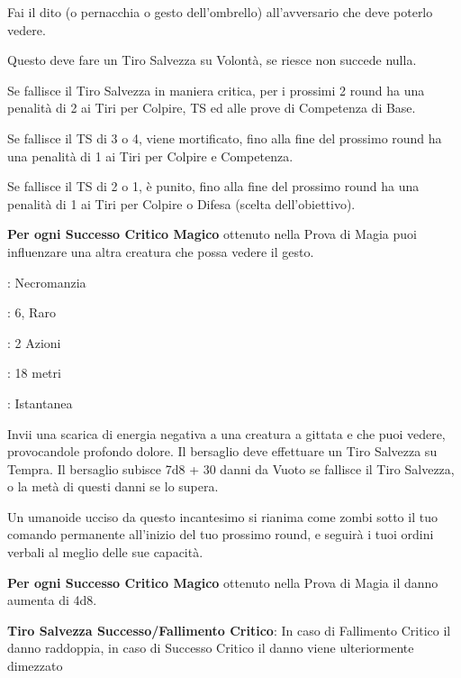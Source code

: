 \begin{multicols}{2}
Fai il dito (o pernacchia o gesto dell'ombrello) all'avversario che deve poterlo vedere.

Questo deve fare un Tiro Salvezza su Volontà, se riesce non succede nulla.

Se fallisce il Tiro Salvezza in maniera critica, per i prossimi 2 round ha una penalità di 2 ai Tiri per Colpire, TS ed alle prove di Competenza di Base.

Se fallisce il TS di 3 o 4, viene mortificato, fino alla fine del prossimo round ha una penalità di 1 ai Tiri per Colpire e Competenza.

Se fallisce il TS di 2 o 1, è punito, fino alla fine del prossimo round ha una penalità di 1 ai Tiri per Colpire o Difesa (scelta dell'obiettivo).

\textbf{Per ogni Successo Critico Magico} ottenuto nella Prova di Magia puoi influenzare una altra creatura che possa vedere il gesto.

\noindent\colorbox{OBSSgold!10}{
\begin{minipage}{0.95\linewidth}
\begin{description}[noitemsep, topsep=0pt, parsep=0pt, partopsep=0pt, leftmargin=0cm, labelwidth=1.3cm]
	\item[\textbf{Lista}]: Necromanzia
	\item[\textbf{Livello}]: 6, Raro
	\item[\textbf{Lancio}]: 2 Azioni
	\item[\textbf{Gittata}]: 18 metri
	\item[\textbf{Durata}]: Istantanea
\end{description}
\end{minipage}}\smallskip

Invii una scarica di energia negativa a una creatura a gittata e che puoi vedere, provocandole profondo dolore. Il bersaglio deve effettuare un Tiro Salvezza su Tempra. Il bersaglio subisce 7d8 + 30 danni da Vuoto se fallisce il Tiro Salvezza, o la metà di questi danni se lo supera.

Un umanoide ucciso da questo incantesimo si rianima come zombi sotto il tuo comando permanente all'inizio del tuo prossimo round, e seguirà i tuoi ordini verbali al meglio delle sue capacità.

\textbf{Per ogni Successo Critico Magico} ottenuto nella Prova di Magia il danno aumenta di 4d8.

\textbf{Tiro Salvezza Successo/Fallimento Critico}: In caso di Fallimento Critico il danno raddoppia, in caso di Successo Critico il danno viene ulteriormente dimezzato


\end{multicols}
